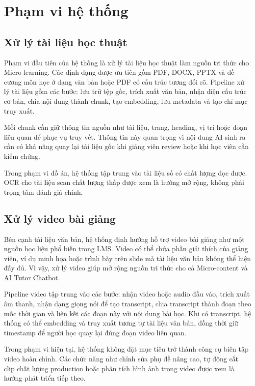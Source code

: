 \section{Phạm vi hệ thống}

\subsection{Xử lý tài liệu học thuật}

Phạm vi đầu tiên của hệ thống là xử lý tài liệu học thuật làm nguồn tri thức
cho Micro-learning. Các định dạng được ưu tiên gồm PDF, DOCX, PPTX và đề
cương môn học ở dạng văn bản hoặc PDF có cấu trúc tương đối rõ. Pipeline xử lý
tài liệu gồm các bước: lưu trữ tệp gốc, trích xuất văn bản, nhận diện cấu trúc
cơ bản, chia nội dung thành chunk, tạo embedding, lưu metadata và tạo chỉ mục
truy xuất.

Mỗi chunk cần giữ thông tin nguồn như tài liệu, trang, heading, vị trí hoặc
đoạn liên quan để phục vụ truy vết. Thông tin này quan trọng vì nội dung AI
sinh ra cần có khả năng quay lại tài liệu gốc khi giảng viên review hoặc khi
học viên cần kiểm chứng.

Trong phạm vi đồ án, hệ thống tập trung vào tài liệu số có chất lượng đọc
được. OCR cho tài liệu scan chất lượng thấp được xem là hướng mở rộng, không
phải trọng tâm đánh giá chính.

\subsection{Xử lý video bài giảng}

Bên cạnh tài liệu văn bản, hệ thống định hướng hỗ trợ video bài giảng như một
nguồn học liệu phổ biến trong LMS. Video có thể chứa phần giải thích của giảng
viên, ví dụ minh họa hoặc trình bày trên slide mà tài liệu văn bản không thể
hiện đầy đủ. Vì vậy, xử lý video giúp mở rộng nguồn tri thức cho cả
Micro-content và AI Tutor Chatbot.

Pipeline video tập trung vào các bước: nhận video hoặc audio đầu vào, trích
xuất âm thanh, nhận dạng giọng nói để tạo transcript, chia transcript thành
đoạn theo mốc thời gian và liên kết các đoạn này với nội dung bài học. Khi có
transcript, hệ thống có thể embedding và truy xuất tương tự tài liệu văn bản,
đồng thời giữ timestamp để người học quay lại đúng đoạn video liên quan.

Trong phạm vi hiện tại, hệ thống không đặt mục tiêu trở thành công cụ biên tập
video hoàn chỉnh. Các chức năng như chỉnh sửa phụ đề nâng cao, tự động cắt
clip chất lượng production hoặc phân tích hình ảnh trong video được xem là
hướng phát triển tiếp theo.

